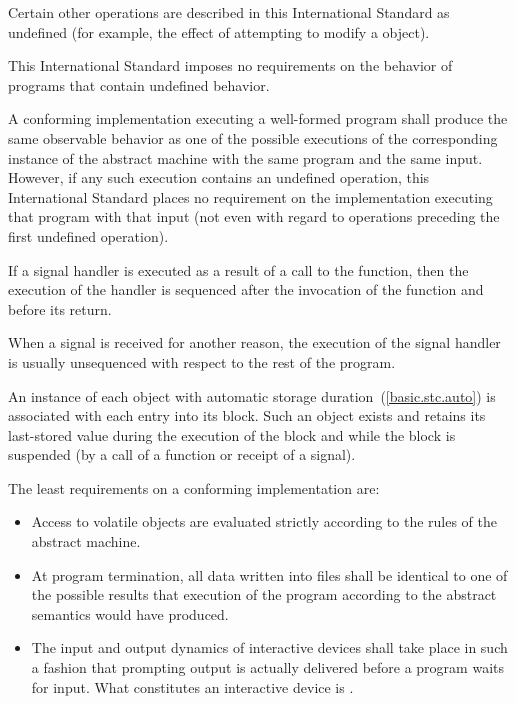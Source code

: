 %
\pnum
Certain other operations are described in this International Standard as
undefined (for example, the effect of
attempting to modify a  object).
\begin{note} This International Standard imposes no requirements on the
behavior of programs that contain undefined behavior. \end{note}

%
%
\pnum
A conforming implementation executing a well-formed program shall
produce the same observable behavior as one of the possible executions
of the corresponding instance of the abstract machine with the
same program and the same input. However, if any such execution contains an undefined operation, this International Standard places no
requirement on the implementation executing that program with that input
(not even with regard to operations preceding the first undefined
operation).

%
%
%
%
\pnum
If a signal handler is executed as a result of a call to the 
function, then the execution of the handler is sequenced after the invocation
of the  function and before its return.
\begin{note} When a signal is received for another reason, the execution of the
signal handler is usually unsequenced with respect to the rest of the program.
\end{note}

\pnum
An instance of each object with automatic storage
duration~(\ref{basic.stc.auto}) is associated with each entry into its
block. Such an object exists and retains its last-stored value during
the execution of the block and while the block is suspended (by a call
of a function or receipt of a signal).

\pnum
The least requirements on a conforming implementation are:

\begin{itemize}

\item
Access to volatile objects are evaluated strictly according to the
rules of the abstract machine.

\item
At program termination, all data written into files shall be
identical to one of the possible results that execution of the program
according to the abstract semantics would have produced.

\item
The input and output dynamics of interactive devices shall take
place in such a fashion that prompting output is actually delivered before a program waits for input. What constitutes an interactive device is
.

\end{itemize}

